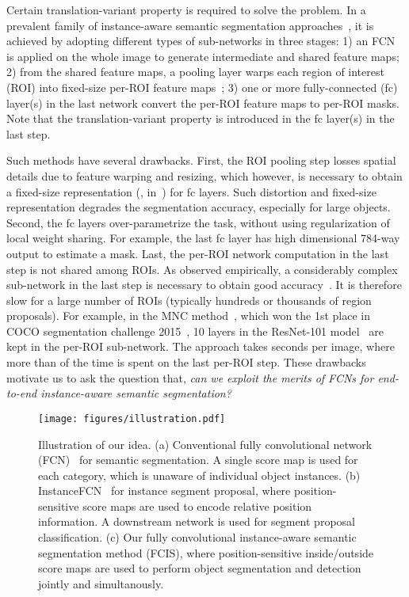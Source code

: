 \documentclass[10pt,twocolumn,letterpaper]{article}
\begin{document}
Certain translation-variant property is required to solve the problem. In a prevalent family of instance-aware semantic segmentation approaches~\cite{dai2015convolutional,hariharan2015hyper,dai2016mnc}, it is achieved by adopting different types of sub-networks in three stages: 1) an FCN is applied on the whole image to generate intermediate and shared feature maps; 2) from the shared feature maps, a pooling layer warps each region of interest (ROI) into fixed-size per-ROI feature maps~\cite{he2014spatial,girshick2015fast}; 3) one or more fully-connected (fc) layer(s) in the last network convert the per-ROI feature maps to per-ROI masks. Note that the translation-variant property is introduced in the fc layer(s) in the last step.

Such methods have several drawbacks. First, the ROI pooling step losses spatial details due to feature warping and resizing, which however, is necessary to obtain a fixed-size representation (\eg,  in~\cite{dai2016mnc}) for fc layers. Such distortion and fixed-size representation degrades the segmentation accuracy, especially for large objects. Second, the fc layers over-parametrize the task, without using regularization of local weight sharing. For example, the last fc layer has high dimensional 784-way output to estimate a  mask. Last, the per-ROI network computation in the last step is not shared among ROIs. As observed empirically, a considerably complex sub-network in the last step is necessary to obtain good accuracy~\cite{ren2015object,dai2016rfcn}. It is therefore slow for a large number of ROIs (typically hundreds or thousands of region proposals). For example, in the MNC method~\cite{dai2016mnc}, which won the 1st place in COCO segmentation challenge 2015~\cite{lin2014coco}, 10 layers in the ResNet-101 model~\cite{he2016deep} are kept in the per-ROI sub-network. The approach takes  seconds per image, where more than  of the time is spent on the last per-ROI step. These drawbacks motivate us to ask the question that, \emph{can we exploit the merits of FCNs for end-to-end instance-aware semantic segmentation?}

\begin{figure*}
	\centering
	\texttt{[image: figures/illustration.pdf]}
	\caption{Illustration of our idea. (a) Conventional fully convolutional network (FCN)~\cite{long2015fully} for semantic segmentation. A single score map is used for each category, which is unaware of individual object instances. (b) InstanceFCN~\cite{dai2016instance} for instance segment proposal, where  position-sensitive score maps are used to encode relative position information. A downstream network is used for segment proposal classification. (c) Our fully convolutional instance-aware semantic segmentation method (FCIS), where position-sensitive inside/outside score maps are used to perform object segmentation and detection jointly and simultanously.}
	\label{fig:instance_sensitive_score_map}
\end{figure*}
\end{document}
